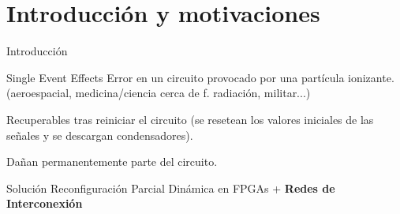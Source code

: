 \section{Introducción y motivaciones}

\begin{frame}{Introducción}
    \begin{block}{Single Event Effects}
        Error en un circuito provocado por una partícula ionizante. (aeroespacial, medicina/ciencia cerca de f. radiación, militar...)
        \pause
        \begin{description}[<+->]
            \item [Soft errors:] Recuperables tras reiniciar el circuito (se resetean los valores iniciales de las señales y se descargan condensadores).
            \item [Hard errors:] Dañan permanentemente parte del circuito.
        \end{description}
    \end{block}
    
    \onslide<+->
    \begin{alertblock}{Solución}
        Reconfiguración Parcial Dinámica en FPGAs + \textbf{Redes de Interconexión}
    \end{alertblock}
    
    \nocite{BinderAnomalies}
\end{frame}